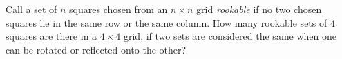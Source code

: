 Call a set of $n$ squares chosen from an $n\times n$ grid \emph{rookable} if no two chosen squares lie in the same row or the same column. How many rookable sets of $4$ squares are there in a $4\times4$ grid, if two sets are considered the same when one can be rotated or reflected onto the other?
